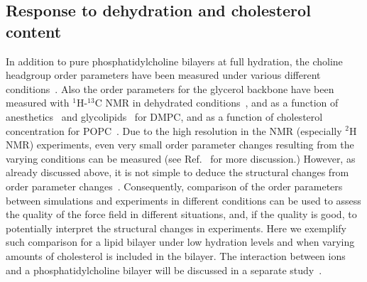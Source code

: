 \documentclass[journal=jacsat,manuscript=article]{achemso}
\begin{document}
\subsection{Response to dehydration and cholesterol content}
In addition to pure phosphatidylcholine bilayers at full hydration, the choline headgroup order parameters
have been measured under various different conditions~\cite{gally75,brown77,brown78,akutsu81,altenbach84,scherer89,bechinger91,ulrich94,dvinskikh05b,castro08,kapla12,ferreira13}.
Also the order parameters for the glycerol backbone have been measured with $^1$H-$^{13}$C NMR in dehydrated conditions~\cite{dvinskikh05b}, and as a function 
of anesthetics~\cite{castro08} and glycolipids~\cite{kapla12} for DMPC, and as a function of cholesterol 
concentration for POPC~\cite{ferreira13}. Due to the high resolution in the NMR (especially $^2$H NMR) experiments,
even very small order parameter changes resulting from the varying conditions can be measured 
(see Ref.~ for more discussion.) 
However, as already discussed above, it is not simple to deduce 
the structural changes from order parameter changes~\cite{akutsu91,semchyschyn04}. Consequently, comparison of the order parameters
between simulations and experiments in different conditions can be used to assess the quality of the force field 
in different situations, and, if the quality is good, to potentially interpret the structural changes in experiments.
Here we exemplify such comparison for a lipid bilayer under low hydration levels and when varying amounts of cholesterol is included in the bilayer. 
The interaction between ions and a phosphatidylcholine bilayer will be discussed in a separate study~\cite{ionpaper}.
\end{document}
